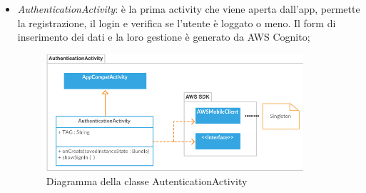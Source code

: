 \begin{itemize}
    \item \emph{AuthenticationActivity}: è la prima activity che viene aperta dall'app, permette la registrazione, il login e verifica se l'utente è loggato o meno. Il form di inserimento dei dati e la loro gestione è generato da AWS Cognito;
        \begin{figure}[H]
        \begin{center}
            \includegraphics[width=0.9\textwidth, keepaspectratio]{../includes/pics/authenticationactivity.png}
            \caption{Diagramma della classe AutenticationActivity}
        \end{center}
        \end{figure}



\end{itemize}
